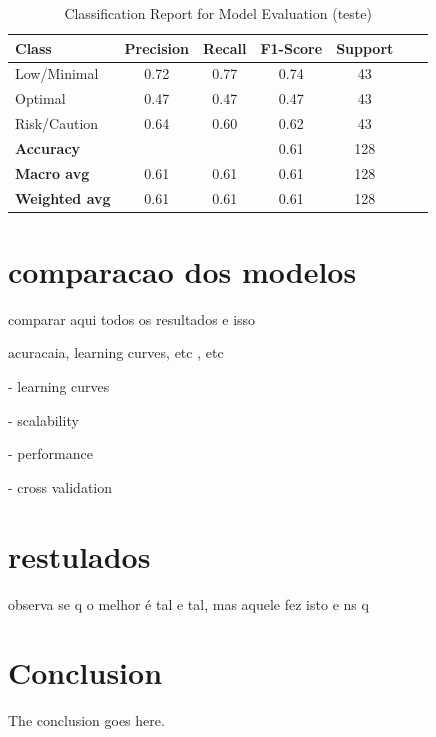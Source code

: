 \documentclass[conference]{IEEEtran}
\begin{document}
\begin{table}[H]
\centering
\caption{Classification Report for Model Evaluation (teste)}
\begin{tabular}{lcccccc}
\toprule
\textbf{Class} & \textbf{Precision} & \textbf{Recall} & \textbf{F1-Score} & \textbf{Support} \\
\midrule
Low/Minimal & 0.72 & 0.77 & 0.74 & 43 \\
Optimal & 0.47 & 0.47 & 0.47 & 43 \\
Risk/Caution & 0.64 & 0.60 & 0.62 & 43 \\
\midrule
\textbf{Accuracy} &  &  & 0.61 & 128 \\
\textbf{Macro avg} & 0.61 & 0.61 & 0.61 & 128 \\
\textbf{Weighted avg} & 0.61 & 0.61 & 0.61 & 128 \\
\bottomrule
\end{tabular}
\end{table}

\section{comparacao dos modelos}

comparar aqui todos os resultados e isso

acuracaia, learning curves, etc , etc

- learning curves

- scalability 

- performance 

- cross validation

\section{restulados}

observa se q o melhor é tal e tal, mas aquele fez isto e ns q


\section{Conclusion}
The conclusion goes here.
\end{document}
